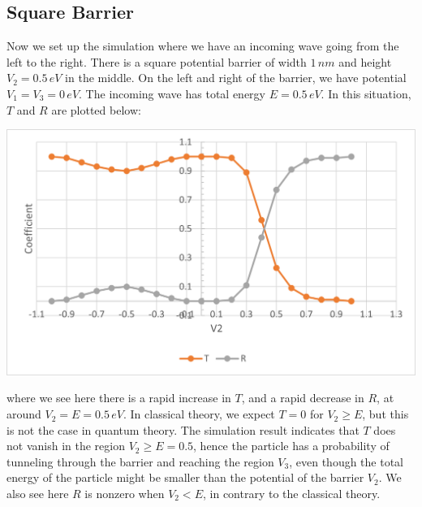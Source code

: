 \documentclass[11pt]{book}
\theoremstyle{break}
\theoremstyle{break}
\begin{document}
\subsection{Square Barrier}
Now we set up the simulation where we have an incoming wave going from the left to the right. There is a square potential barrier of width $1\, nm $ and height $V_2=0.5\, eV$ in the middle. On the left and right of the barrier, we have potential $V_1 = V_3 = 0\, eV$. The incoming wave has total energy $E=0.5\, eV$. In this situation, $T$ and $R$ are plotted below:
\begin{center}
\includegraphics[scale=1.19]{Tunnel}
\end{center}
where we see here there is a rapid increase in $T$, and a rapid decrease in $R$, at around $V_2 = E = 0.5\, eV$. In classical theory, we expect $T=0$ for $V_2 \geq E$, but this is not the case in quantum theory. The simulation result indicates that $T$ does not vanish in the region $V_2 \geq E = 0.5$, hence the particle has a probability of tunneling through the barrier and reaching the region $V_3$, even though the total energy of the particle might be smaller than the potential of the barrier $V_2$. We also see here $R$ is nonzero when $V_2 < E$, in contrary to the classical theory.\\
\end{document}
